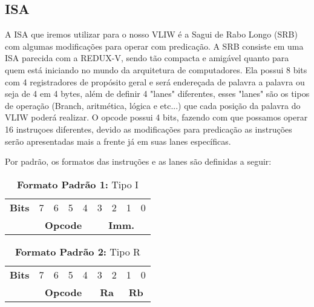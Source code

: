 \documentclass{article}
\begin{document}
    \subsection{ISA}

    A ISA que iremos utilizar para o nosso VLIW é a Sagui de Rabo Longo (SRB) com algumas modificações para operar com predicação.
    A SRB consiste em uma ISA parecida com a REDUX-V, sendo tão compacta e amigável quanto para quem está iniciando no mundo da arquitetura de computadores. 
    Ela possui 8 bits com 4 registradores de propósito geral e será endereçada de palavra a palavra ou seja de 4 em 4 bytes, além de definir 4 "lanes" diferentes, esses "lanes" são os tipos de operação (Branch, aritmética, lógica e etc...) que cada posição da palavra do VLIW poderá realizar. O opcode possui 4 bits, fazendo com que possamos operar 16 instruçoes diferentes, devido as modificações para predicação as instruções serão apresentadas mais a frente já em suas lanes específicas.
    
    Por padrão, os formatos das instruções e as lanes são definidas a seguir:

    \begin{table}[h]
      \captionsetup{labelformat=empty, skip=0pt}
      \caption{\textbf{Formato Padrão 1:} Tipo I}
      \centering
      \begin{tabular}{|c|*{8}{c|}}
        \hline
        \rowcolor{green!50}
        \multicolumn{9}{|c|}{\textbf{Tipo I}} \\ \hline
        \textbf{Bits} & 7 & 6 & 5 & 4 & 3 & 2 & 1 & 0 \\ \hline
        & \multicolumn{4}{c|}{\textbf{Opcode}} & \multicolumn{4}{c|}{\textbf{Imm.}} \\ \hline
      \end{tabular}
    \end{table}

    \begin{table}[h]
      \captionsetup{labelformat=empty, skip=0pt}
      \caption{\textbf{Formato Padrão 2:} Tipo R}
      \centering
      \begin{tabular}{|c|*{8}{c|}}
        \hline
        \rowcolor{blue!50}
        \multicolumn{9}{|c|}{\textbf{Tipo R}} \\ \hline
        \textbf{Bits} & 7 & 6 & 5 & 4 & 3 & 2 & 1 & 0 \\ \hline
        & \multicolumn{4}{c|}{\textbf{Opcode}} & \multicolumn{2}{c|}{\textbf{Ra}} & \multicolumn{2}{c|}{\textbf{Rb}} \\ \hline
      \end{tabular}
    \end{table}
\end{document}
